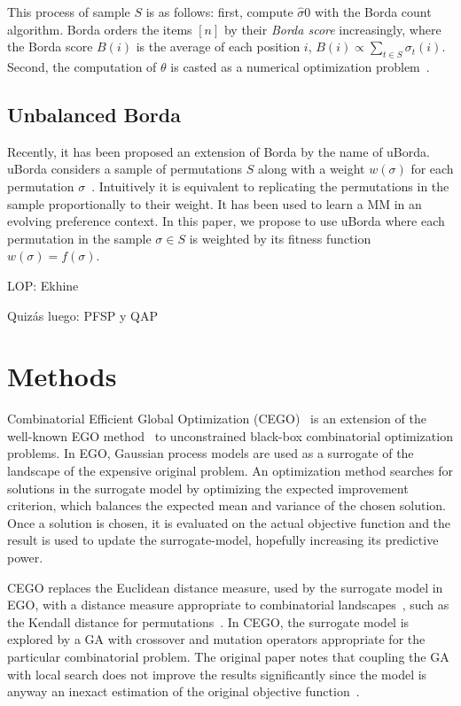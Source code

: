 \documentclass[runningheads]{llncs}
\begin{document}
This process of sample $S$ is as follows: first, compute $\hat\sigma0$ with the Borda count algorithm. Borda orders the items $[n]$ by their \textit{Borda score} increasingly, where the Borda score $B(i)$ is the average of each position $i$, $B(i) \propto \sum_{t\in S}  \sigma_t(i)$. Second, the computation of $\theta$ is casted as a numerical optimization problem~\cite{Irurozki2016b}. 

\subsection{Unbalanced Borda}\label{sec:uborda}
Recently, it has been proposed an extension of Borda by the name of uBorda. uBorda considers a sample of permutations $S$ along with a weight $w(\sigma)$ for each permutation $\sigma$~\cite{}. Intuitively it is equivalent to replicating the permutations in the sample proportionally to their weight. It has been used to learn a MM in an evolving preference context. In this paper, we propose to use uBorda where each permutation in the sample $\sigma\in S$ is weighted by its fitness function $w(\sigma)=f(\sigma)$.




LOP: Ekhine

Quizás luego: PFSP y QAP

\section{Methods}



Combinatorial Efficient Global Optimization
(CEGO)~\citep{ZaeStoFriFisNauBar2014} is an extension of the well-known EGO
method~\citep{JonSchWel98go} to unconstrained black-box combinatorial
optimization problems. In EGO, Gaussian process models are used as a surrogate
of the landscape of the expensive original problem. An optimization method
searches for solutions in the surrogate model by optimizing the expected
improvement criterion, which balances the expected mean and variance of the
chosen solution. Once a solution is chosen, it is evaluated on the actual
objective function and the result is used to update the surrogate-model,
hopefully increasing its predictive power.

CEGO replaces the Euclidean distance measure, used by the surrogate model in
EGO, with a distance measure appropriate to combinatorial
landscapes~\citep{ZaeStoBar2014:ppsn}, such as the Kendall distance for
permutations~\citep{?}. In CEGO, the surrogate model is explored by a GA with
crossover and mutation operators appropriate for the particular combinatorial
problem. The original paper notes that coupling the GA with local search does
not improve the results significantly since the model is anyway an inexact
estimation of the original objective
function~\citep[p.~875]{ZaeStoFriFisNauBar2014}.
\end{document}
